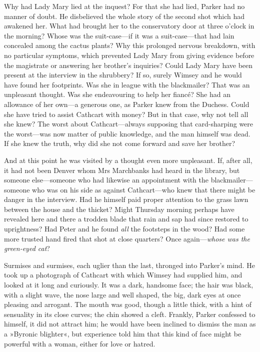 Why had Lady Mary lied at the inquest? For that she had lied, Parker had no manner of doubt. He disbelieved the whole story of the second shot which had awakened her. What had brought her to the conservatory door at three o'clock in the morning? Whose was the suit-case\allowbreak---\allowbreak if it was a suit-case\allowbreak---\allowbreak that had lain concealed among the cactus plants? Why this prolonged nervous breakdown, with no particular symptoms, which prevented Lady Mary from giving evidence before the magistrate or answering her brother's inquiries? Could Lady Mary have been present at the interview in the shrubbery? If so, surely Wimsey and he would have found her footprints. Was she in league with the blackmailer? That was an unpleasant thought. Was she endeavouring to help her fiancé? She had an allowance of her own\allowbreak---\allowbreak a generous one, as Parker knew from the Duchess. Could she have tried to assist Cathcart with money? But in that case, why not tell all she knew? The worst about Cathcart\allowbreak---\allowbreak always supposing that card-sharping were the worst\allowbreak---\allowbreak was now matter of public knowledge, and the man himself was dead. If she knew the truth, why did she not come forward and save her brother?

And at this point he was visited by a thought even more unpleasant. If, after all, it had not been Denver whom Mrs Marchbanks had heard in the library, but someone else\allowbreak---\allowbreak someone who had likewise an appointment with the blackmailer\allowbreak---\allowbreak someone who was on his side as against Cathcart\allowbreak---\allowbreak who knew that there might be danger in the interview. Had he himself paid proper attention to the grass lawn between the house and the thicket?  Might Thursday morning perhaps have revealed here and there a trodden blade that rain and sap had since restored to uprightness? Had Peter and he found \textit{all} the footsteps in the wood? Had some more trusted hand fired that shot at close quarters? Once again---\textit{whose was the green-eyed cat}?

Surmises and surmises, each uglier than the last, thronged into Parker's mind. He took up a photograph of Cathcart with which Wimsey had supplied him, and looked at it long and curiously. It was a dark, handsome face; the hair was black, with a slight wave, the nose large and well shaped, the big, dark eyes at once pleasing and arrogant. The mouth was good, though a little thick, with a hint of sensuality in its close curves; the chin showed a cleft. Frankly, Parker confessed to himself, it did not attract him; he would have been inclined to dismiss the man as a »Byronic blighter«, but experience told him that this kind of face might be powerful with a woman, either for love or hatred.

